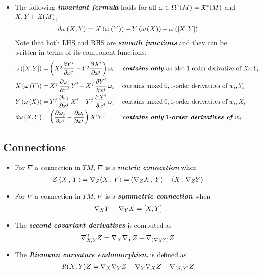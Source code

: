 \documentclass[11pt]{article}
\begin{document}
\begin{itemize}
\item The following \emph{\textbf{invariant formula}} holds for all $\omega \in \Omega^{1}(M) = {\mathfrak X}^{*}(M)$ and $X, Y \in {\mathfrak X}(M)$, 
\begin{align}
d\omega\left(X, Y\right) &= X\left(\omega\left(Y\right)\right) - Y\left(\omega\left(X\right)\right) - \omega\left([X, Y]\right) \label{eqn: ext_derivative_invariant_form}
\end{align} Note that both LHS and RHS are \emph{\textbf{smooth functions}} and they can be written in terms of its component functions:
\begin{align*}
\omega\left([X, Y]\right) &= \left(X^j\frac{\partial Y^i}{ \partial x^j} - Y^j\frac{\partial X^i}{ \partial x^j}\right)\omega_i && \text{ \emph{\textbf{contains only $w_i$}} also $1$-order derivative of $X_i, Y_i$}\\
X\left(\omega\left(Y\right)\right) &= X^j\, \frac{\partial \omega_i}{ \partial x^j}\,Y^i + X^{j}\,\frac{\partial Y^i}{ \partial x^j}\,\omega_i && \text{ contains mixed $0,1$-order derivatives of $w_i, Y_i$}\\
Y\left(\omega\left(X\right)\right) &= Y^j\, \frac{\partial \omega_i}{ \partial x^j}\,X^i + Y^{j}\,\frac{\partial X^i}{ \partial x^j}\,\omega_i && \text{ contains mixed $0,1$-order derivatives of $w_i, X_i$}\\
d\omega\left(X, Y\right) &= \left(\frac{\partial \omega_j}{ \partial x^i} - \frac{\partial \omega_i}{ \partial x^j}\right)X^{i}Y^{j} && \text{ \textbf{\emph{contains only $1$-order derivatives of $w_i$}}}
\end{align*}
\end{itemize}

\subsection{Connections}
\begin{itemize}
\item For $\nabla$ a connection in $TM$, $\nabla$ is a \emph{\textbf{metric connection}} when 
\begin{align}
Z\left\langle X\,,\, Y \right\rangle = \nabla_{Z}{\left\langle X\,,\, Y \right\rangle} &= \left\langle \nabla_{Z}{X}\,,\, Y \right\rangle + \left\langle X\,,\, \nabla_{Z}{Y} \right\rangle  \label{eqn: metric_connection}
\end{align}

\item For $\nabla$ a connection in $TM$, $\nabla$ is a \emph{\textbf{symmetric connection}} when 
\begin{align}
\nabla_{X}{Y} - \nabla_{Y}{X} &= [X, Y] \label{eqn: symmetric_connection}
\end{align}

\item The \emph{\textbf{second covariant derivatives}}  is computed as 
\begin{align}
\nabla^2_{X,Y}Z &= \nabla_{X}{\nabla_{Y}{Z}} - \nabla_{(\nabla_{X}{Y})}{Z}   \label{eqn: 2nd_covariant_derivative}
\end{align}

\item The \emph{\textbf{Riemann curvature endomorphism}} is defined as
\begin{align}
R(X,Y)Z &=  \nabla_{X}{\nabla_{Y}{Z}} - \nabla_{Y}{\nabla_{X}{Z}} - \nabla_{[X,Y]}{Z}  \label{eqn: riemann_curv_endo}
\end{align}
\end{itemize}
\end{document}
